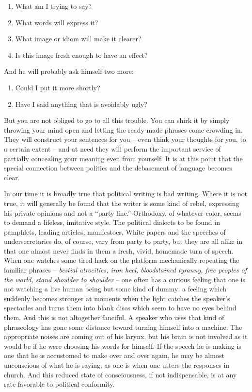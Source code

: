 \documentclass[article,twoside,a4paper]{memoir}
\begin{document}
\begin{enumerate}
  \item What am I trying to say?
  \item What words will express it?
  \item What image or idiom will make it clearer?
  \item Is this image fresh enough to have an effect?
\end{enumerate}

And he will probably ask himself two more:

\begin{enumerate}
  \item Could I put it more shortly?
  \item Have I said anything that is avoidably ugly?
\end{enumerate}

But you are not obliged to go to all this trouble. You can shirk it by
simply throwing your mind open and letting the ready-made phrases come crowding
in. They will construct your sentences for you -- even think your thoughts for
you, to a certain extent -- and at need they will perform the important service
of partially concealing your meaning even from yourself. It is at this point
that the special connection between politics and the debasement of language
becomes clear.

In our time it is broadly true that political writing is bad writing. Where
it is not true, it will generally be found that the writer is some kind of rebel,
expressing his private opinions and not a ``party line.'' Orthodoxy,
of whatever color, seems to demand a lifeless, imitative style. The political
dialects to be found in pamphlets, leading articles, manifestoes, White papers
and the speeches of undersecretaries do, of course, vary from party to party,
but they are all alike in that one almost never finds in them a fresh, vivid,
homemade turn of speech. When one watches some tired hack on the platform mechanically
repeating the familiar phrases -- \emph{bestial atrocities, iron heel, bloodstained
  tyranny, free peoples of the world, stand shoulder to shoulder} -- one often
has a curious feeling that one is not watching a live human being but some kind
of dummy: a feeling which suddenly becomes stronger at moments when the light
catches the speaker's spectacles and turns them into blank discs which seem
to have no eyes behind them. And this is not altogether fanciful. A speaker
who uses that kind of phraseology has gone some distance toward turning himself
into a machine. The appropriate noises are coming out of his larynx, but his
brain is not involved as it would be if he were choosing his words for himself.
If the speech he is making is one that he is accustomed to make over and over
again, he may be almost unconscious of what he is saying, as one is when one
utters the responses in church. And this reduced state of consciousness, if
not indispensable, is at any rate favorable to political conformity.
\end{document}

